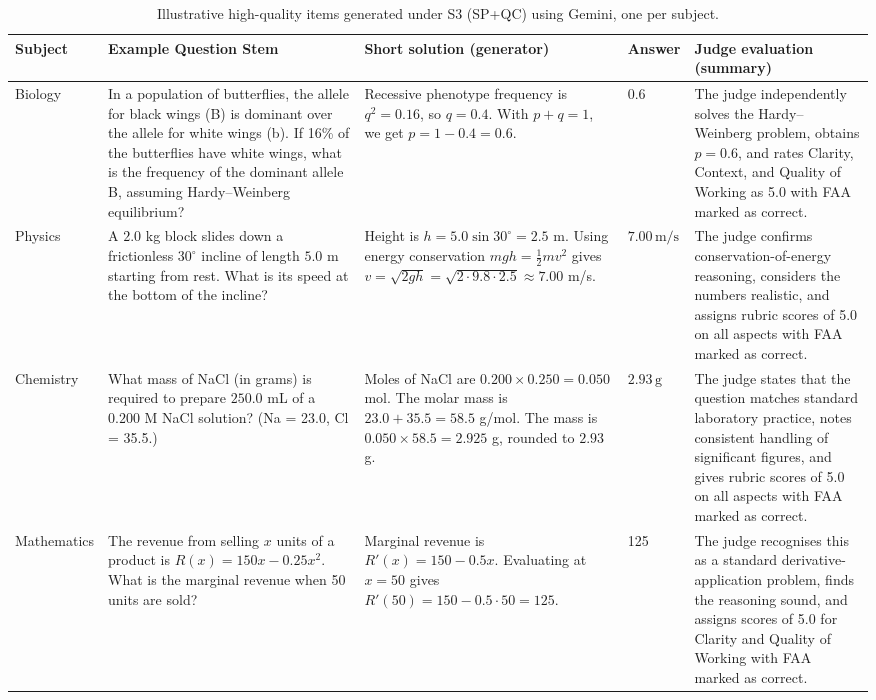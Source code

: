 ﻿\documentclass[a4paper,conference,10pt]{IEEEtran}
\begin{document}
\begin{table}[!t]
\centering
\small
\caption{Illustrative high-quality items generated under S3 (SP+QC) using Gemini, one per subject.}
\label{tab:example-items-s3}
\begin{tabular}{|p{1.3cm}|p{4.1cm}|p{4.2cm}|p{0.8cm}|p{4.1cm}|}
\hline
\textbf{Subject} & \textbf{Example Question Stem} & \textbf{Short solution (generator)} & \textbf{Answer} & \textbf{Judge evaluation (summary)} \\ \hline
Biology &
In a population of butterflies, the allele for black wings (B) is dominant over the allele for white wings (b). If 16\% of the butterflies have white wings, what is the frequency of the dominant allele B, assuming Hardy--Weinberg equilibrium? &
Recessive phenotype frequency is \(q^2 = 0.16\), so \(q = 0.4\). With \(p + q = 1\), we get \(p = 1 - 0.4 = 0.6\). &
0.6 &
The judge independently solves the Hardy--Weinberg problem, obtains \(p = 0.6\), and rates Clarity, Context, and Quality of Working as 5.0 with FAA marked as correct. \\ \hline
Physics &
A \(2.0\) kg block slides down a frictionless \(30^{\circ}\) incline of length \(5.0\) m starting from rest. What is its speed at the bottom of the incline? &
Height is \(h = 5.0 \sin 30^{\circ} = 2.5\) m. Using energy conservation \(mgh = \tfrac{1}{2}mv^2\) gives \(v = \sqrt{2gh} = \sqrt{2 \cdot 9.8 \cdot 2.5} \approx 7.00\) m/s. &
\(7.00\,\text{m/s}\) &
The judge confirms conservation-of-energy reasoning, considers the numbers realistic, and assigns rubric scores of 5.0 on all aspects with FAA marked as correct. \\ \hline
Chemistry &
What mass of NaCl (in grams) is required to prepare \(250.0\) mL of a \(0.200\) M NaCl solution? (Na = 23.0, Cl = 35.5.) &
Moles of NaCl are \(0.200 \times 0.250 = 0.050\) mol. The molar mass is \(23.0 + 35.5 = 58.5\) g/mol. The mass is \(0.050 \times 58.5 = 2.925\) g, rounded to \(2.93\) g. &
\(2.93\,\text{g}\) &
The judge states that the question matches standard laboratory practice, notes consistent handling of significant figures, and gives rubric scores of 5.0 on all aspects with FAA marked as correct. \\ \hline
Mathematics &
The revenue from selling \(x\) units of a product is \(R(x) = 150x - 0.25x^2\). What is the marginal revenue when 50 units are sold? &
Marginal revenue is \(R'(x) = 150 - 0.5x\). Evaluating at \(x = 50\) gives \(R'(50) = 150 - 0.5 \cdot 50 = 125\). &
125 &
The judge recognises this as a standard derivative-application problem, finds the reasoning sound, and assigns scores of 5.0 for Clarity and Quality of Working with FAA marked as correct. \\ \hline
\end{tabular}
\normalsize
\end{table}
\end{document}
